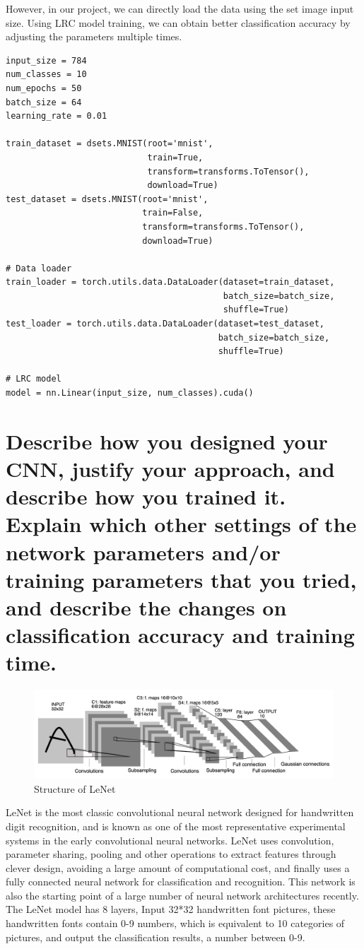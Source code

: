 \documentclass{article}
\begin{document}
However, in our project, we can directly load the data using the set image input size. Using LRC model training, we can obtain better classification accuracy by adjusting the parameters multiple times.
\begin{lstlisting}
input_size = 784
num_classes = 10
num_epochs = 50 
batch_size = 64
learning_rate = 0.01

train_dataset = dsets.MNIST(root='mnist',
                            train=True,
                            transform=transforms.ToTensor(),
                            download=True)
test_dataset = dsets.MNIST(root='mnist',
                           train=False,
                           transform=transforms.ToTensor(),
                           download=True)

# Data loader
train_loader = torch.utils.data.DataLoader(dataset=train_dataset,
                                           batch_size=batch_size,
                                           shuffle=True)
test_loader = torch.utils.data.DataLoader(dataset=test_dataset,
                                          batch_size=batch_size,
                                          shuffle=True)

# LRC model
model = nn.Linear(input_size, num_classes).cuda()
\end{lstlisting}

\section{Describe how you designed your CNN, justify your approach, and describe how you trained it. Explain
which other settings of the network parameters and/or training parameters that you tried, and describe the
changes on classification accuracy and training time.}

\begin{figure}[H]
    \caption{Structure of LeNet}
    \includegraphics[width=1\textwidth]{Fig1}
\end{figure}

​LeNet is the most classic convolutional neural network designed for handwritten digit recognition, and is known as one of the most representative experimental systems in the early convolutional neural networks.
LeNet uses convolution, parameter sharing, pooling and other operations to extract features through clever design, avoiding a large amount of computational cost, and finally uses a fully connected neural network for classification and recognition. This network is also the starting point of a large number of neural network architectures recently.
The LeNet model has 8 layers, Input 32*32 handwritten font pictures, these handwritten fonts contain 0-9 numbers, which is equivalent to 10 categories of pictures, and output the classification results, a number between 0-9.
\end{document}
